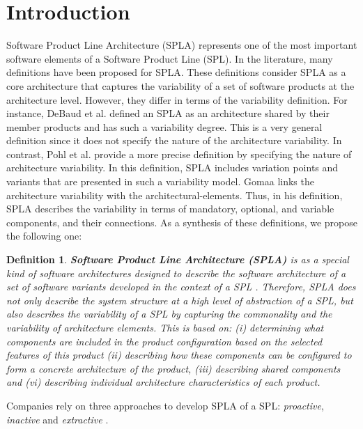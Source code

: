 \documentclass[graybox]{svmult}
\newtheorem{mydef}{Definition}
\begin{document}
\section{Introduction}
\label{sec:1:intro}
Software Product Line Architecture (SPLA) represents one of the most important software elements of a Software Product Line (SPL). In the literature, many definitions have been proposed for SPLA. These definitions consider SPLA as a core architecture that captures the variability of a set of software products at the architecture level. However, they differ in terms of the variability definition. For instance, DeBaud et al. \cite{debaud1998pulse} defined an SPLA as an architecture shared by their member products and has such a variability degree. This is a very general definition since it does not specify the nature of the architecture variability. In contrast, Pohl et al. \cite{3_pohl2005software} provide a more precise definition by specifying the nature of architecture variability. In this definition, SPLA includes variation points and variants that are presented in such a variability model. Gomaa \cite{Gomaa} links the architecture variability with the architectural-elements. Thus, in his definition, SPLA describes the variability in terms of mandatory, optional, and variable components, and their connections. As a synthesis of these definitions, we propose the following one:

\begin{mydef}
\textbf{Software Product Line Architecture (SPLA)} is as a special kind of software architectures designed to describe the software architecture of a set of software variants developed in the context of a SPL \cite{1_clements2002}. Therefore, SPLA does not only describe the system structure at a high level of abstraction of a SPL, but also describes the variability of a SPL by capturing the commonality and the variability of architecture elements. This is based on: (i) determining what components are included in the product configuration based on the selected features of this product (ii) describing how these components can be configured to form a concrete architecture of the product, (iii) describing shared components and (vi) describing individual architecture characteristics of each product. 
\end{mydef}

Companies rely on three approaches to develop SPLA of a SPL: \textit{proactive}, \textit{inactive} and \textit{extractive} \cite{gasparic2014analysis,shatnawi2017recovering}.
\end{document}
